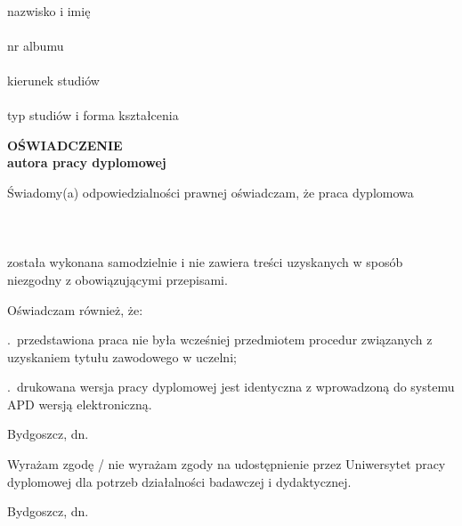\thispagestyle{empty}
\clearpage
\noindent\makebox[0.4\textwidth]{\dotfill}\\
nazwisko i imię\\[0.2cm]
\noindent\makebox[0.4\textwidth]{\dotfill}\\
nr albumu\\[0.2cm]
\noindent\makebox[0.4\textwidth]{\dotfill}\\
kierunek studiów\\[0.2cm]
\noindent\makebox[0.4\textwidth]{\dotfill}\\
typ studiów i forma kształcenia\\

\begin{center}
    \textbf{OŚWIADCZENIE}\\[0.3cm]
    \textbf{autora pracy dyplomowej}
\end{center}

\noindent
Świadomy(a) odpowiedzialności prawnej oświadczam, że praca dyplomowa\\[0.3cm]
\mbox{}\dotfill\\
\mbox{}\dotfill\\
\mbox{}\dotfill\\[0.2cm]
\noindent
została wykonana samodzielnie i nie zawiera treści uzyskanych w sposób niezgodny z obowiązującymi przepisami.

\vspace{0.5cm}
\noindent
Oświadczam również, że:

.~przedstawiona praca nie była wcześniej przedmiotem procedur związanych z uzyskaniem tytułu zawodowego w uczelni;

.~drukowana wersja pracy dyplomowej jest identyczna z wprowadzoną do systemu APD wersją elektroniczną. \\

\noindent
\phantom{dummy text}\hspace{7cm}\dotfill

\noindent
Bydgoszcz, dn.\ \makebox[0.3\textwidth]{\dotfill} \\
\noindent

\noindent Wyrażam zgodę / nie wyrażam zgody na udostępnienie przez Uniwersytet pracy dyplomowej dla potrzeb działalności badawczej i dydaktycznej. \\

\noindent
\phantom{dummy text}\hspace{7cm}\dotfill

\noindent
Bydgoszcz, dn.\ \makebox[0.3\textwidth]{\dotfill}